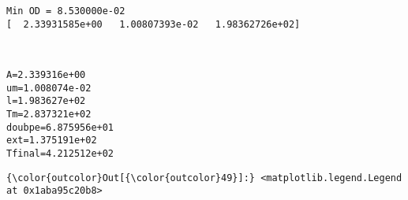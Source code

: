 \documentclass[11pt]{article}
\begin{document}
    \begin{Verbatim}[commandchars=\\\{\}]
Min OD = 8.530000e-02
[  2.33931585e+00   1.00807393e-02   1.98362726e+02]

    \end{Verbatim}

    \begin{center}
    \end{center}
    { \hspace*{\fill} \\}
    
    \begin{Verbatim}[commandchars=\\\{\}]
A=2.339316e+00
um=1.008074e-02
l=1.983627e+02
Tm=2.837321e+02
doubpe=6.875956e+01
ext=1.375191e+02
Tfinal=4.212512e+02

    \end{Verbatim}

            \begin{Verbatim}[commandchars=\\\{\}]
{\color{outcolor}Out[{\color{outcolor}49}]:} <matplotlib.legend.Legend at 0x1aba95c20b8>
\end{Verbatim}
        
    \begin{center}
    \end{center}
    { \hspace*{\fill} \\}
    
    \begin{center}
    \end{center}
    { \hspace*{\fill} \\}
    
\end{document}
